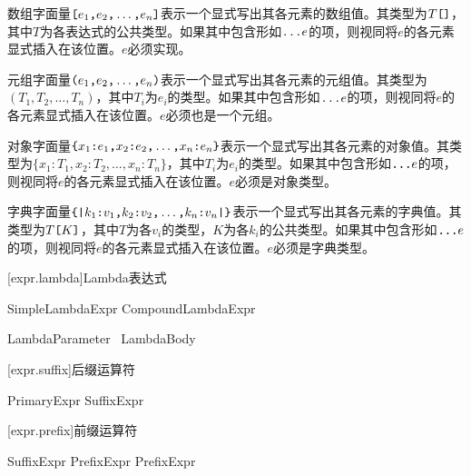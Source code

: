 \pnum
数组字面量$\texttt{[}e_1\texttt{,} e_2\texttt{,} \ldots\texttt{,} e_n\texttt{]}$表示一个显式写出其各元素的数组值。其类型为$T\texttt{[]}$，其中$T$为各表达式的公共类型。如果其中包含形如$\texttt{...}e$的项，则视同将$e$的各元素显式插入在该位置。$e$必须实现。

\pnum
元组字面量$\texttt{(}e_1\texttt{,} e_2\texttt{,} \ldots\texttt{,} e_n\texttt{)}$表示一个显式写出其各元素的元组值。其类型为$(T_1, T_2, \ldots, T_n)$，其中$T_i$为$e_i$的类型。如果其中包含形如$\texttt{...}e$的项，则视同将$e$的各元素显式插入在该位置。$e$必须也是一个元组。

\pnum
对象字面量$\texttt{\{}x_1\texttt{:} e_1\texttt{,} x_2\texttt{:} e_2\texttt{,} \ldots\texttt{,} x_n\texttt{:} e_n\texttt{\}}$表示一个显式写出其各元素的对象值。其类型为$\{x_1: T_1, x_2: T_2, \ldots, x_n: T_n\}$，其中$T_i$为$e_i$的类型。如果其中包含形如$\texttt{...}e$的项，则视同将$e$的各元素显式插入在该位置。$e$必须是对象类型。

\pnum
字典字面量$\texttt{\{|}k_1\texttt{:} v_1\texttt{,} k_2\texttt{:} v_2\texttt{,} \ldots\texttt{,} k_n\texttt{:} v_n\texttt{|\}}$表示一个显式写出其各元素的字典值。其类型为$T\texttt{[}K\texttt{]}$，其中$T$为各$v_i$的类型，$K$为各$k_i$的公共类型。如果其中包含形如$\texttt{...}e$的项，则视同将$e$的各元素显式插入在该位置。$e$必须是字典类型。

[expr.lambda]{Lambda表达式}

\begin{bnf}
 \br
    SimpleLambdaExpr \br
    CompoundLambdaExpr
\end{bnf}

\begin{bnf}
 \br
    LambdaParameter\bnfq\ \terminal{=>} LambdaBody
\end{bnf}

\begin{bnf}
 \br
\end{bnf}

[expr.suffix]{后缀运算符}

\begin{bnf}
 \br
    PrimaryExpr
    SuffixExpr
\end{bnf}

[expr.prefix]{前缀运算符}

\begin{bnf}
 \br
    SuffixExpr \br
    \terminal{+} PrefixExpr \br
    \terminal{-} PrefixExpr \br
\end{bnf}

